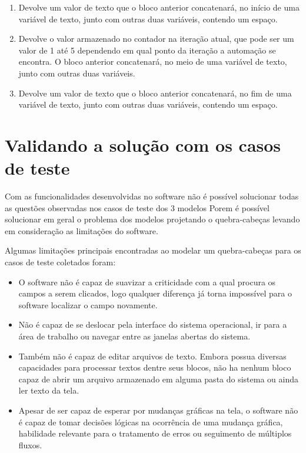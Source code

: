\documentclass[tg]{mdtufsm}
\begin{document}
\begin{enumerate}[label*=\arabic*.]
\begin{enumerate}[label*=\arabic*.]
                    \end{enumerate}
                    \item Devolve um valor de texto que o bloco anterior concatenará, no início de uma variável de texto, junto com outras duas variáveis, contendo um espaço.
                    \item Devolve o valor armazenado no contador na iteração atual, que pode ser um valor de 1 até 5 dependendo em qual ponto da iteração a automação se encontra. O bloco anterior concatenará, no meio de uma variável de texto, junto com outras duas variáveis.
                    \item Devolve um valor de texto que o bloco anterior concatenará, no fim de uma variável de texto, junto com outras duas variáveis, contendo um espaço.
                \end{enumerate}

            \section {Validando a solução com os casos de teste}

                Com as funcionalidades desenvolvidas no software não é possível solucionar todas as questões observadas nos casos de teste dos 3 modelos Porem é possível solucionar em geral o problema dos modelos projetando o quebra-cabeças levando em consideração as limitações do software.

                Algumas limitações principais encontradas ao modelar um quebra-cabeças para os casos de teste coletados foram:

                \begin{itemize}
                    \item O software não é capaz de suavizar a criticidade com a qual procura os campos a serem clicados, logo qualquer diferença já torna impossível para o software localizar o campo novamente.
                    \item Não é capaz de se deslocar pela interface do sistema operacional, ir para a área de trabalho ou navegar entre as janelas abertas do sistema.
                    \item Também não é capaz de editar arquivos de texto. Embora possua diversas capacidades para processar textos dentre seus blocos, não ha nenhum bloco capaz de abrir um arquivo armazenado em alguma pasta do sistema ou ainda ler texto da tela.
                    \item Apesar de ser capaz de esperar por mudanças gráficas na tela, o software não é capaz de tomar decisões lógicas na ocorrência de uma mudança gráfica, habilidade relevante para o tratamento de erros ou seguimento de múltiplos fluxos.
                \end{itemize}
\end{document}
